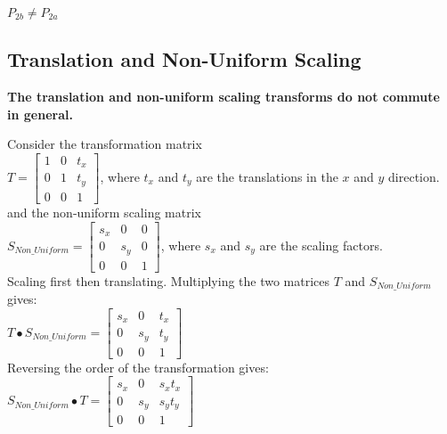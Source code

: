 \documentclass[a4paper,10pt]{scrartcl}
\begin{document}
$P_{2b} \neq P_{2a}$

\subsection{Translation and Non-Uniform Scaling}


{\bfseries The translation and non-uniform scaling transforms do not commute in general.}

Consider the transformation matrix \\

$T = 
\begin{bmatrix}
    1       & 0 & t_x \\
    0       & 1 & t_y \\
    0       & 0 & 1 
\end{bmatrix}
$, where $t_x $ and $t_y$ are the translations in the $x$ and $y$ direction. \\

and the non-uniform scaling matrix \\

$S_{Non\_Uniform} = \begin{bmatrix}
    s_x       & 0 & 0 \\
    0       & s_y & 0 \\
    0       & 0 & 1     
 \end{bmatrix}
$, where $s_x$ and $s_y$ are the scaling factors. \\

Scaling first then translating. Multiplying the two matrices $T$ and $S_{Non\_Uniform}$ gives: \\

$T \bullet S_{Non\_Uniform} = \begin{bmatrix}
		  s_x & 0 & t_x \\
		  0 & s_y & t_y \\
		  0 & 0 & 1
               \end{bmatrix}
$ \\

Reversing the order of the transformation gives: \\

$S_{Non\_Uniform} \bullet T = \begin{bmatrix}
		  s_x & 0 & s_xt_x \\
		  0 & s_y & s_yt_y \\
		  0 & 0 & 1
               \end{bmatrix}
$ \\ 
\end{document}
